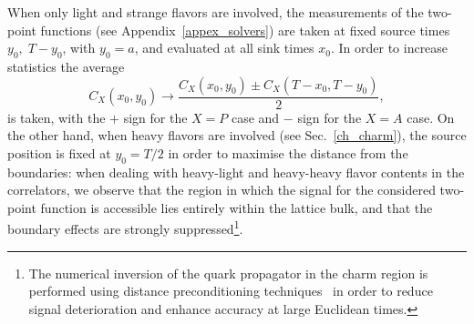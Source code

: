 When only light and strange flavors are involved, the measurements of the two-point functions (see Appendix~\ref{appex_solvers}) are taken at fixed source times $y_0,\;T-y_0$, with $y_0=a$, and evaluated at all sink times $x_0$. In order to increase statistics the average
\begin{equation}
C_X(x_0,y_0)\to\frac{C_X(x_0,y_0)\pm C_X(T-x_0,T-y_0)}{2},
\end{equation}
is taken, with the $+$ sign for the $X=P$ case and $-$ sign for the $X=A$ case. On the other hand, when heavy flavors are involved (see Sec.~\ref{ch_charm}), the source position is fixed at $y_0=T/2$ in order to maximise the distance from the boundaries: when dealing with heavy-light and heavy-heavy flavor contents in the correlators, we observe that the region in which the signal for the considered two-point function is accessible lies entirely within the lattice bulk, and that the boundary effects are strongly suppressed\footnote{The numerical inversion of the quark propagator in the charm region is performed using distance preconditioning techniques~\cite{deDivitiis:2010ya,Collins:2017iud} in order to reduce signal deterioration and enhance accuracy at large  Euclidean times.}.

